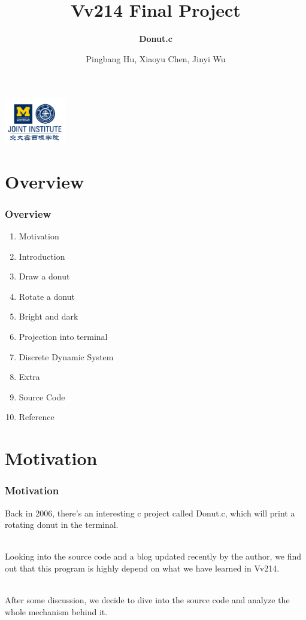 \documentclass[12pt, t]{beamer}
\title{Vv214 Final Project}
\subtitle{\textbf{Donut.c}}
\institute[UM-SJTU JI]{University of Michigan-Shanghai Jiao Tong University Joint Institute}
\author{Pingbang Hu, Xiaoyu Chen, Jinyi Wu}
\newcommand{\nullspace}{~\\[15pt]}
\begin{document}
\begin{frame}
    \titlepage
    \begin{center}
        \includegraphics[height=2cm]{Figures/logo/logo2.png}
    \end{center}
\end{frame}

\section{Overview}
    \begin{frame}
        \frametitle{Overview}
        \begin{enumerate}
            \item Motivation
            \item Introduction
            \item Draw a donut
            \item Rotate a donut
            \item Bright and dark
            \item Projection into terminal
            \item Discrete Dynamic System
            \item Extra
            \item Source Code
            \item Reference
        \end{enumerate}
    \end{frame}


\section{Motivation}
\begin{frame}
    \frametitle{Motivation}

    Back in 2006, there's an interesting c project called Donut.c, which will print a rotating 
    donut in the terminal.

    \nullspace
    Looking into the source code and a blog updated recently by the author, we find out 
    that this program is highly depend on what we have learned in Vv214.

    \nullspace
    After some discussion, we decide to dive into the source code and analyze the whole mechanism 
    behind it.

\end{frame}
\end{document}
